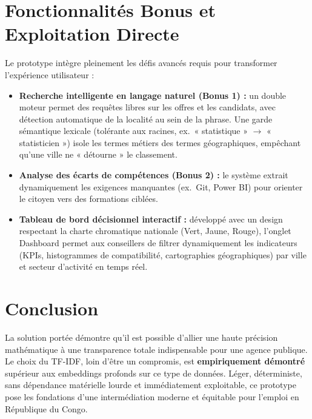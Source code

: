 \documentclass[11pt,a4paper]{article}
\begin{document}
\section{Fonctionnalités Bonus et Exploitation Directe}
Le prototype intègre pleinement les défis avancés requis pour transformer l'expérience
utilisateur :
\begin{itemize}
  \item \textbf{Recherche intelligente en langage naturel (Bonus 1) :} un double moteur permet des
  requêtes libres sur les offres et les candidats, avec détection automatique de la localité au
  sein de la phrase. Une garde sémantique lexicale (tolérante aux racines, ex.\ « statistique »
  $\to$ « statisticien ») isole les termes métiers des termes géographiques, empêchant qu'une
  ville ne « détourne » le classement.
  \item \textbf{Analyse des écarts de compétences (Bonus 2) :} le système extrait dynamiquement les
  exigences manquantes (ex.\ Git, Power BI) pour orienter le citoyen vers des formations ciblées.
  \item \textbf{Tableau de bord décisionnel interactif :} développé avec un design respectant la
  charte chromatique nationale (Vert, Jaune, Rouge), l'onglet Dashboard permet aux conseillers de
  filtrer dynamiquement les indicateurs (KPIs, histogrammes de compatibilité, cartographies
  géographiques) par ville et secteur d'activité en temps réel.
\end{itemize}

\section{Conclusion}
La solution portée démontre qu'il est possible d'allier une haute précision mathématique à une
transparence totale indispensable pour une agence publique. Le choix du TF-IDF, loin d'être un
compromis, est \textbf{empiriquement démontré} supérieur aux embeddings profonds sur ce type de
données. Léger, déterministe, sans dépendance matérielle lourde et immédiatement exploitable, ce
prototype pose les fondations d'une intermédiation moderne et équitable pour l'emploi en
République du Congo.

\end{document}
